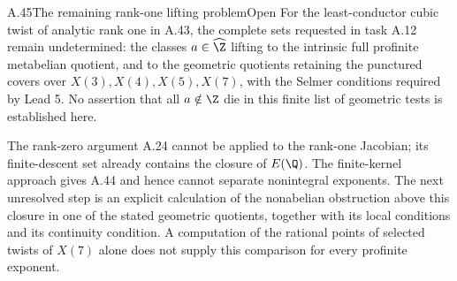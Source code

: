 \begin{statement}{A.45}{The remaining rank-one lifting problem}{Open}
For the least-conductor cubic twist of analytic rank one in A.43,
the complete sets requested in task A.12 remain undetermined: the
classes $a\in\widehat\Z$ lifting to the intrinsic full profinite
metabelian quotient, and to the geometric quotients retaining the
punctured covers over $X(3),X(4),X(5),X(7)$, with the Selmer conditions
required by Lead 5. No assertion that all $a\notin\Z$ die in this
finite list of geometric tests is established here.
\end{statement}
The rank-zero argument A.24 cannot be applied to the rank-one
Jacobian; its finite-descent set already contains the closure of
$E(\Q)$. The finite-kernel approach gives A.44 and hence cannot
separate nonintegral exponents. The next unresolved step is an
explicit calculation of the nonabelian obstruction above this
closure in one of the stated geometric quotients, together with
its local conditions and its continuity condition. A computation
of the rational points of selected twists of $X(7)$ alone does not
supply this comparison for every profinite exponent.
